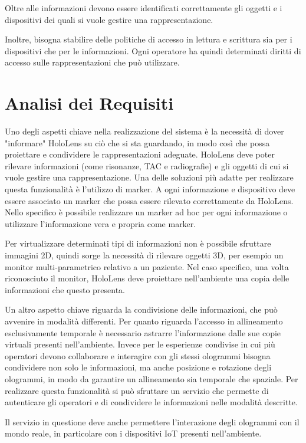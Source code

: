 Oltre alle informazioni devono essere identificati correttamente gli oggetti e i dispositivi dei quali si vuole gestire una rappresentazione.

Inoltre, bisogna stabilire delle politiche di accesso in lettura e scrittura sia per i dispositivi che per le informazioni.
Ogni operatore ha quindi determinati diritti di accesso sulle rappresentazioni che può utilizzare.

\section{Analisi dei Requisiti}

Uno degli aspetti chiave nella realizzazione del sistema è la necessità di dover "informare" HoloLens su ciò che si sta guardando, in modo così che possa proiettare e condividere le rappresentazioni adeguate.
HoloLens deve poter rilevare informazioni (come risonanze, TAC e radiografie) e gli oggetti di cui si vuole gestire una rappresentazione. Una delle soluzioni più adatte per realizzare questa funzionalità è l'utilizzo di marker.
A ogni informazione e dispositivo deve essere associato un marker che possa essere rilevato correttamente da HoloLens. Nello specifico è possibile realizzare un marker ad hoc per ogni informazione o utilizzare l'informazione vera e propria come marker.

Per virtualizzare determinati tipi di informazioni non è possibile sfruttare immagini 2D, quindi sorge la necessità di rilevare oggetti 3D, per esempio un monitor multi-parametrico relativo a un paziente. Nel caso specifico, una volta riconosciuto il monitor, HoloLens deve proiettare nell'ambiente una copia delle informazioni che questo presenta.

Un altro aspetto chiave riguarda la condivisione delle informazioni, che può avvenire in modalità differenti.
Per quanto riguarda l'accesso in allineamento esclusivamente temporale è necessario astrarre l'informazione dalle sue copie virtuali presenti nell'ambiente.
Invece per le esperienze condivise in cui più operatori devono collaborare e interagire con gli stessi ologrammi bisogna condividere non solo le informazioni, ma anche posizione e rotazione degli ologrammi, in modo da garantire un allineamento sia temporale che spaziale.
Per realizzare questa funzionalità si può sfruttare un servizio che permette di autenticare gli operatori e di condividere le informazioni nelle modalità descritte.

Il servizio in questione deve anche permettere l'interazione degli ologrammi con il mondo reale, in particolare con i dispositivi IoT presenti nell'ambiente.

